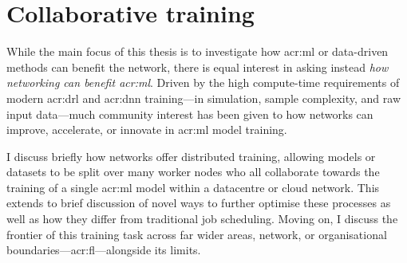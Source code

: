 \section{Collaborative training}\label{sec:ddn-collaborative-training}
While the main focus of this thesis is to investigate how \gls{acr:ml} or data-driven methods can benefit the network, there is equal interest in asking instead \emph{how networking can benefit \gls{acr:ml}}.
Driven by the high compute-time requirements of modern \gls{acr:drl} and \gls{acr:dnn} training---in simulation, sample complexity, and raw input data---much community interest has been given to how networks can improve, accelerate, or innovate in \gls{acr:ml} model training.

I discuss briefly how networks offer distributed training, allowing models or datasets to be split over many worker nodes who all collaborate towards the training of a single \gls{acr:ml} model within a datacentre or cloud network.
This extends to brief discussion of novel ways to further optimise these processes as well as how they differ from traditional job scheduling.
Moving on, I discuss the frontier of this training task across far wider areas, network, or organisational boundaries---\acrfull{acr:fl}---alongside its limits.


